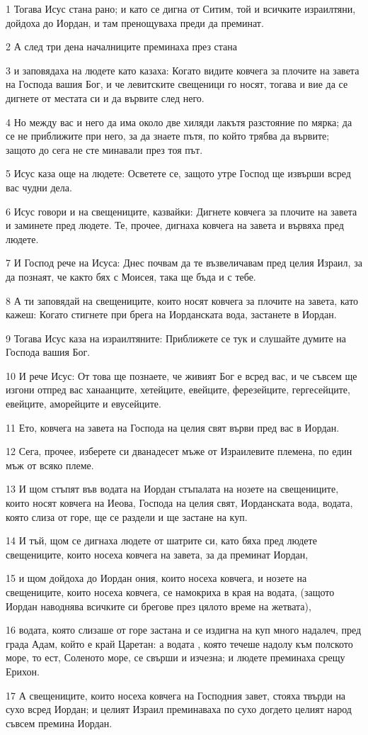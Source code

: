 \par 1 Тогава Исус стана рано; и като се дигна от Ситим, той и всичките израилтяни, дойдоха до Иордан, и там пренощуваха преди да преминат.
\par 2 А след три дена началниците преминаха през стана
\par 3 и заповядаха на людете като казаха: Когато видите ковчега за плочите на завета на Господа вашия Бог, и че левитските свещеници го носят, тогава и вие да се дигнете от местата си и да вървите след него.
\par 4 Но между вас и него да има около две хиляди лакътя разстояние по мярка; да се не приближите при него, за да знаете пътя, по който трябва да вървите; защото до сега не сте минавали през тоя път.
\par 5 Исус каза още на людете: Осветете се, защото утре Господ ще извърши всред вас чудни дела.
\par 6 Исус говори и на свещениците, казвайки: Дигнете ковчега за плочите на завета и заминете пред людете. Те, прочее, дигнаха ковчега на завета и вървяха пред людете.
\par 7 И Господ рече на Исуса: Днес почвам да те възвеличавам пред целия Израил, за да познаят, че както бях с Моисея, така ще бъда и с тебе.
\par 8 А ти заповядай на свещениците, които носят ковчега за плочите на завета, като кажеш: Когато стигнете при брега на Иорданската вода, застанете в Иордан.
\par 9 Тогава Исус каза на израилтяните: Приближете се тук и слушайте думите на Господа вашия Бог.
\par 10 И рече Исус: От това ще познаете, че живият Бог е всред вас, и че съвсем ще изгони отпред вас ханаанците, хетейците, евейците, ферезейците, гергесейците, евейците, аморейците и евусейците.
\par 11 Ето, ковчега на завета на Господа на целия свят върви пред вас в Иордан.
\par 12 Сега, прочее, изберете си дванадесет мъже от Израилевите племена, по един мъж от всяко племе.
\par 13 И щом стъпят във водата на Иордан стъпалата на нозете на свещениците, които носят ковчега на Иеова, Господа на целия свят, Иорданската вода, водата, която слиза от горе, ще се раздели и ще застане на куп.
\par 14 И тъй, щом се дигнаха людете от шатрите си, като бяха пред людете свещениците, които носеха ковчега на завета, за да преминат Иордан,
\par 15 и щом дойдоха до Иордан ония, които носеха ковчега, и нозете на свещениците, които носеха ковчега, се намокриха в края на водата, (защото Иордан наводнява всичките си брегове през цялото време на жетвата),
\par 16 водата, която слизаше от горе застана и се издигна на куп много надалеч, пред града Адам, който е край Царетан: а водата , която течеше надолу към полското море, то ест, Соленото море, се свърши и изчезна; и людете преминаха срещу Ерихон.
\par 17 А свещениците, които носеха ковчега на Господния завет, стояха твърди на сухо всред Иордан; и целият Израил преминаваха по сухо догдето целият народ съвсем премина Иордан.

